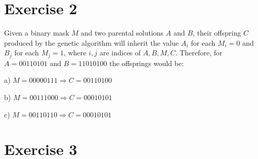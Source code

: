 \section*{Exercise 2}

Given a binary mask $M$ and two parental solutions $A$ and $B$, their offspring $C$ produced by the genetic algorithm will inherit the value $A_i$ for each $M_i = 0$ and $B_j$ for each $M_j = 1$, where $i,j$ are indices of $A, B, M, C$. Therefore, for $A=00110101$ and $B=11010100$ the offsprings would be:

a) $ M=00000111 \Rightarrow C =  00110100$

b) $ M=00111000 \Rightarrow C = 00010101$

c) $ M=00110110 \Rightarrow C = 00010101$

\section*{Exercise 3}

